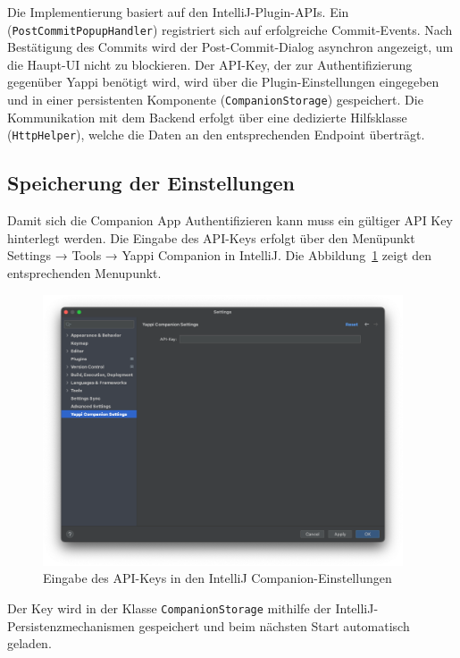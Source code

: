 \documentclass[12pt,a4paper]{report}
\begin{document}
Die Implementierung basiert auf den IntelliJ-Plugin-APIs. Ein (\texttt{PostCommitPopupHandler}) registriert sich auf erfolgreiche
Commit-Events. Nach Bestätigung des Commits wird der Post-Commit-Dialog asynchron angezeigt, um die Haupt-UI nicht zu blockieren.
Der API-Key, der zur Authentifizierung gegenüber Yappi benötigt wird, wird über die Plugin-Einstellungen eingegeben und in einer
persistenten Komponente (\texttt{CompanionStorage}) gespeichert. Die Kommunikation mit dem Backend erfolgt über eine dedizierte
Hilfsklasse (\texttt{HttpHelper}), welche die Daten an den entsprechenden Endpoint überträgt.

\subsection{Speicherung der Einstellungen}

Damit sich die Companion App Authentifizieren kann muss ein gültiger API Key hinterlegt werden. Die Eingabe des API-Keys erfolgt
über den Menüpunkt Settings → Tools → Yappi Companion in IntelliJ. Die Abbildung~\ref{fig:intellij-settings} zeigt den 
entsprechenden Menupunkt.

\begin{figure}[H]
\centering
\includegraphics[width=0.95\textwidth]{../figures/intellij-settings.png}
\caption{Eingabe des API-Keys in den IntelliJ Companion-Einstellungen}
\label{fig:intellij-settings}
\end{figure}

Der Key wird in der Klasse \texttt{CompanionStorage} mithilfe der IntelliJ-Persistenzmechanismen gespeichert und beim nächsten
Start automatisch geladen.
\end{document}
